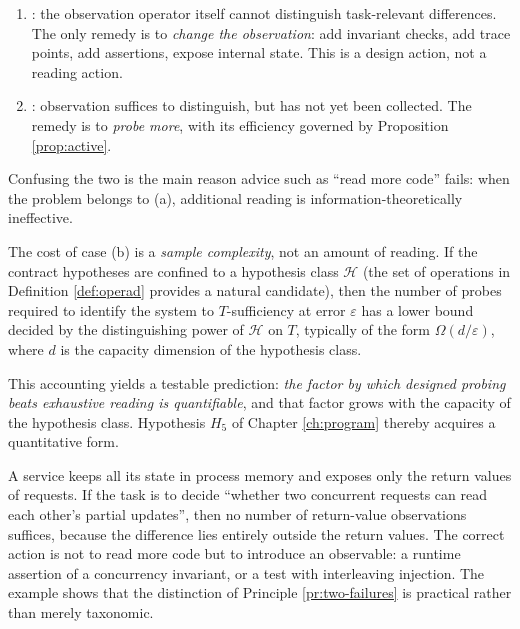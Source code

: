\begin{principle}\label{pr:two-failures}
\begin{enumerate}[label=(\alph*)]
\item {}: the observation operator itself cannot distinguish task-relevant
      differences. The only remedy is to \emph{change the observation}: add invariant checks,
      add trace points, add assertions, expose internal state. This is a design action, not a
      reading action.
\item {}: observation suffices to distinguish, but has
      not yet been collected. The remedy is to \emph{probe more}, with its efficiency governed
      by Proposition \ref{prop:active}.
\end{enumerate}
Confusing the two is the main reason advice such as ``read more code'' fails: when the problem
belongs to (a), additional reading is information-theoretically ineffective.
\end{principle}

\begin{remark}\label{rmk:sample-complexity}
The cost of case (b) is a \emph{sample complexity}, not an amount of reading. If the contract
hypotheses are confined to a hypothesis class $\mathcal{H}$ (the set of operations in
Definition \ref{def:operad} provides a natural candidate), then the number of probes required
to identify the system to $T$-sufficiency at error $\varepsilon$ has a lower bound decided by
the distinguishing power of $\mathcal{H}$ on $T$, typically of the form
$\Omega(d/\varepsilon)$, where $d$ is the capacity dimension of the hypothesis class.

This accounting yields a testable prediction: \emph{the factor by which designed probing beats
exhaustive reading is quantifiable}, and that factor grows with the capacity of the hypothesis
class. Hypothesis $H_5$ of Chapter \ref{ch:program} thereby acquires a quantitative form.
\end{remark}

\begin{example}\label{ex:rank-deficient}
A service keeps all its state in process memory and exposes only the return values of requests.
If the task is to decide ``whether two concurrent requests can read each other's partial
updates'', then no number of return-value observations suffices, because the difference lies
entirely outside the return values. The correct action is not to read more code but to
introduce an observable: a runtime assertion of a concurrency invariant, or a test with
interleaving injection. The example shows that the distinction of Principle
\ref{pr:two-failures} is practical rather than merely taxonomic.
\end{example}


